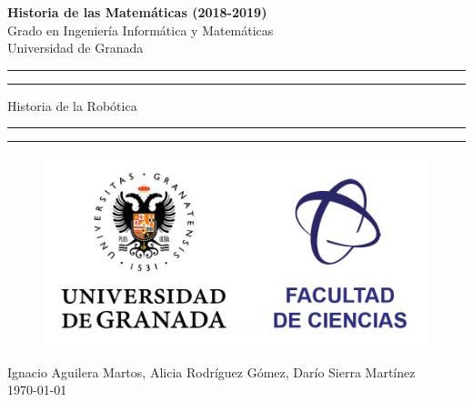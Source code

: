 \documentclass[a4paper,11pt]{article}
\begin{document}
	\begin{center}
		\large{\textbf{Historia de las Matemáticas (2018-2019)} \\ Grado en Ingeniería Informática y Matemáticas \\ Universidad de Granada }
		\vspace*{2.5cm}

		\rule{\textwidth}{1.6pt}\vspace*{-\baselineskip}\vspace*{4pt}
		\rule{\textwidth}{1.6pt}\vspace*{-\baselineskip}\vspace*{2pt}
		\vspace{0.5cm}

		\Huge{Historia de la Robótica}

		\vspace{0.5cm}
		\rule{\textwidth}{1.6pt}\vspace*{-\baselineskip}\vspace*{2pt}
		\rule{\textwidth}{1.6pt}\vspace*{-\baselineskip}\vspace*{4pt}

		\vspace{2cm}

\begin{figure}[h!]
	\centering
	\includegraphics[scale=0.5]{TeoriaDeAutomatas/img/logoUgrCiencias}
	\label{fig:logougrciencias}
\end{figure}

		\vspace{1.5cm}
		\large{Ignacio Aguilera Martos, Alicia Rodríguez Gómez, Darío Sierra Martínez \\ \today }

	\end{center}
\end{document}
